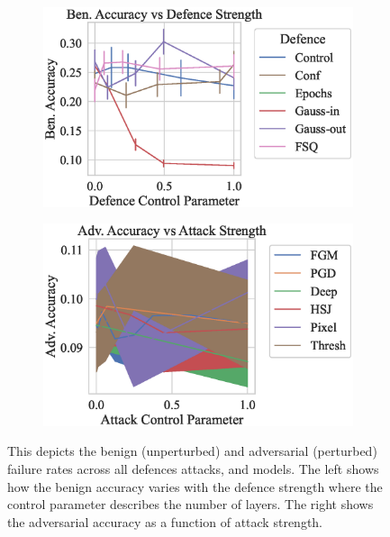\begin{figure}
    \centering
    \begin{subfigure}[]{0.45\textwidth}
        \centering
        \includegraphics[width=\textwidth]{cifar/def_param_vs_accuracy.eps}
    \end{subfigure}
    \begin{subfigure}[]{0.45\textwidth}
        \centering
        \includegraphics[width=\textwidth]{cifar/atk_param_vs_accuracy.eps}
    \end{subfigure}
    \caption{This depicts the benign (unperturbed) and adversarial (perturbed) failure rates across all defences attacks, and models. The left shows how the benign accuracy varies with the defence strength where the control parameter describes the number of layers. The right shows the adversarial accuracy as a function of attack strength.}
    \label{fig:cifar_strength}
\end{figure}

